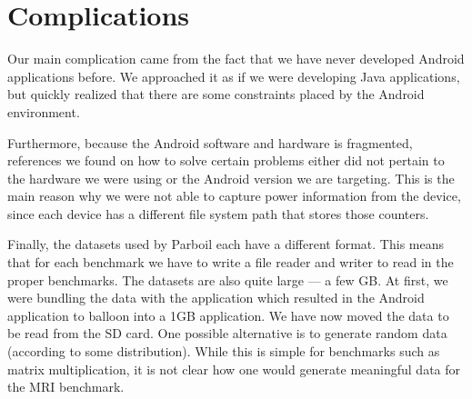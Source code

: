 \section*{Complications}

Our main complication came from the fact that we have never developed Android applications
  before.
We approached it as if we were developing Java applications, but quickly realized that 
  there are some constraints placed by the Android environment.

Furthermore, because the Android software and hardware is fragmented, references we found
  on how to solve certain problems either did not pertain to the hardware we were using
  or the Android version we are targeting.
This is the main reason why we were not able to capture power information from the device,
  since each device has a different file system path that stores those counters.

Finally, the datasets used by Parboil each have a different format.
This means that for each benchmark we have to write a file reader and writer to read in the proper benchmarks.
The datasets are also quite large --- a few GB.
At first, we were bundling the data with the application which resulted in the Android application
  to balloon into a 1GB application.
We have now moved the data to be read from the SD card.
One possible alternative is to generate random data (according to some distribution).
While this is simple for benchmarks such as matrix multiplication, it is not clear how one would
  generate meaningful data for the MRI benchmark.